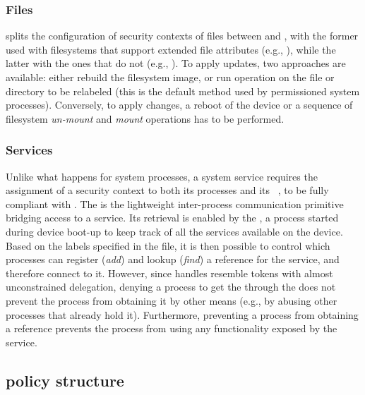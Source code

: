\subsubsection{Files}

\sel splits the configuration of security contexts of files between
\filecontexts and \genfscontexts, with the former used with
filesystems that support extended file attributes (e.g., \data), while
the latter with the ones that do not (e.g., \proc).  To apply
\filecontexts updates, two approaches are available: either rebuild
the filesystem image, or run \restorecon operation on the file or
directory to be relabeled (this is the default method used by
permissioned system processes).  Conversely, to apply \genfscontexts
changes, a reboot of the device or a sequence of filesystem {\em
  un-mount} and {\em mount} operations has to be performed.

\subsubsection{Services}

Unlike what happens for system processes, a system service requires
the assignment of a security context to both its processes and its
\binder~\cite{seapp_binder}, to be fully compliant with \sea.  The
\binder is the lightweight inter-process communication primitive
bridging access to a service.  Its retrieval is enabled by the
\servicemanager, a process started during device boot-up to keep track
of all the services available on the device.  Based on the labels
specified in the \servicecontexts file, it is then possible to control
which processes can register ({\em add}) and lookup ({\em find}) a
\binder reference for the service, and therefore connect to it.
However, since \binder handles resemble tokens with almost
unconstrained delegation, denying a process to get the \binder through
the \servicemanager does not prevent the process from obtaining it by
other means (e.g., by abusing other processes that already hold it).
Furthermore, preventing a process from obtaining a \binder reference
prevents the process from using any functionality exposed by the
service.

\subsection{\pap policy structure}\label{subsect:seapp_structure}

